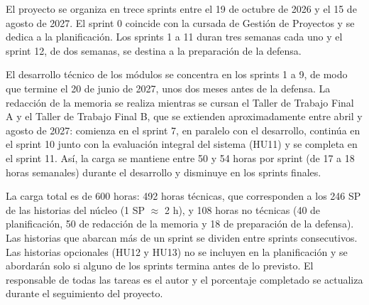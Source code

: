 \documentclass[
11pt, %
]{charter}
\begin{document}
El proyecto se organiza en trece sprints entre el 19 de octubre de 2026 y el 15 de agosto de 2027. El sprint 0 coincide con la cursada de Gestión de Proyectos y se dedica a la planificación. Los sprints 1 a 11 duran tres semanas cada uno y el sprint 12, de dos semanas, se destina a la preparación de la defensa.

El desarrollo técnico de los módulos se concentra en los sprints 1 a 9, de modo que termine el 20 de junio de 2027, unos dos meses antes de la defensa. La redacción de la memoria se realiza mientras se cursan el Taller de Trabajo Final A y el Taller de Trabajo Final B, que se extienden aproximadamente entre abril y agosto de 2027: comienza en el sprint 7, en paralelo con el desarrollo, continúa en el sprint 10 junto con la evaluación integral del sistema (HU11) y se completa en el sprint 11. Así, la carga se mantiene entre 50 y 54 horas por sprint (de 17 a 18 horas semanales) durante el desarrollo y disminuye en los sprints finales.

La carga total es de 600 horas: 492 horas técnicas, que corresponden a los 246 SP de las historias del núcleo (1 SP $\approx$ 2 h), y 108 horas no técnicas (40 de planificación, 50 de redacción de la memoria y 18 de preparación de la defensa). Las historias que abarcan más de un sprint se dividen entre sprints consecutivos. Las historias opcionales (HU12 y HU13) no se incluyen en la planificación y se abordarán solo si alguno de los sprints termina antes de lo previsto. El responsable de todas las tareas es el autor y el porcentaje completado se actualiza durante el seguimiento del proyecto.
\end{document}
